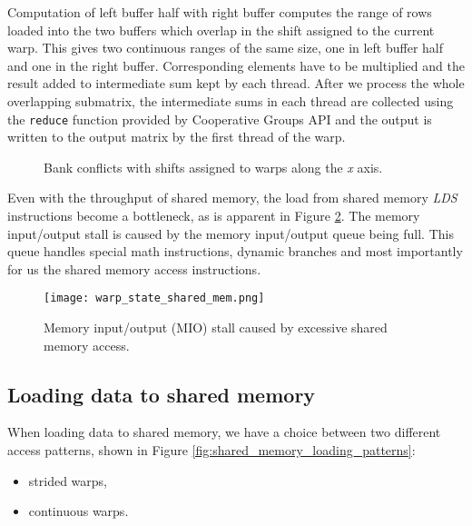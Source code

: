 Computation of left buffer half with right buffer computes the range of rows loaded into the two buffers which overlap in the shift assigned to the current warp. This gives two continuous ranges of the same size, one in left buffer half and one in the right buffer. Corresponding elements have to be multiplied and the result added to intermediate sum kept by each thread. After we process the whole overlapping submatrix, the intermediate sums in each thread are collected using the \texttt{reduce} function provided by Cooperative Groups API and the output is written to the output matrix by the first thread of the warp.


\begin{figure}[ht]
	\centering
	\def\svgwidth{0.5\textwidth}
	
	\caption{Bank conflicts with shifts assigned to warps along the \textit{x} axis.}
	\label{fig:warp_per_shift_shared_mem_overlaps_in_x}
\end{figure}


Even with the throughput of shared memory, the load from shared memory \textit{LDS} instructions become a bottleneck, as is apparent in Figure \ref{fig:warp_state_shared_mem}. The memory input/output stall is caused by the memory input/output queue being full. This queue handles special math instructions, dynamic branches and most importantly for us the shared memory access instructions.

\begin{figure}[ht]
	\centering
	\texttt{[image: warp\_state\_shared\_mem.png]}
	\caption{Memory input/output (MIO) stall caused by excessive shared memory access.}
	\label{fig:warp_state_shared_mem}
\end{figure}

\subsection{Loading data to shared memory}

When loading data to shared memory, we have a choice between two different access patterns, shown in Figure \ref{fig:shared_memory_loading_patterns}:
\begin{itemize}
	\item strided warps,
	\item continuous warps.
\end{itemize}

